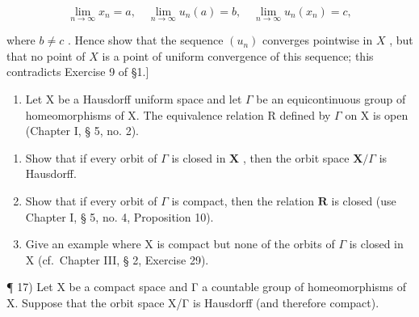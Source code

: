 \[
\lim _ {n \rightarrow \infty} x _ {n} = a, \quad \lim _ {n \rightarrow \infty} u _ {n} (a) = b, \quad \lim _ {n \rightarrow \infty} u _ {n} (x _ {n}) = c,
\]

where \(b \neq c\) . Hence show that the sequence \((u_n)\) converges pointwise in \(X\) , but that no point of \(X\) is a point of uniform convergence of this sequence; this contradicts Exercise 9 of §1.{]}

\begin{enumerate}
\def\labelenumi{\arabic{enumi})}
\setcounter{enumi}{15}
\tightlist
\item
  Let X be a Hausdorff uniform space and let \(\Gamma\) be an equicontinuous group of homeomorphisms of X. The equivalence relation R defined by \(\Gamma\) on X is open (Chapter I, § 5, no. 2).
\end{enumerate}

\begin{enumerate}
\def\labelenumi{\alph{enumi})}
\item
  Show that if every orbit of \(\Gamma\) is closed in \(\mathbf{X}\) , then the orbit space \(\mathbf{X} / \Gamma\) is Hausdorff.
\item
  Show that if every orbit of \(\Gamma\) is compact, then the relation \(\mathbf{R}\) is closed (use Chapter I, § 5, no. 4, Proposition 10).
\item
  Give an example where X is compact but none of the orbits of \(\Gamma\) is closed in X (cf.~Chapter III, § 2, Exercise 29).
\end{enumerate}

¶ 17) Let X be a compact space and Γ a countable group of homeomorphisms of X. Suppose that the orbit space X/Γ is Hausdorff (and therefore compact).

